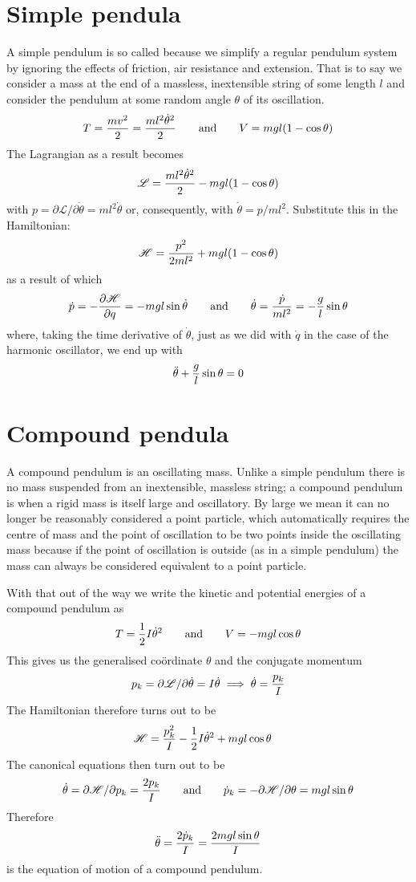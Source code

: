 \documentclass[english,seminar,headertitle]{lecture}
\newcommand{\lag}{\mathscr{L}}
\newcommand{\ham}{\mathscr{H}}
\begin{document}
\section{Simple pendula}

A simple pendulum is so called because we simplify a regular pendulum system by ignoring the effects of friction, air resistance and extension. That is to say we consider a mass at the end of a massless, inextensible string of some length $l$ and consider the pendulum at some random angle $\theta$ of its oscillation.
$$
T = {mv^2 \over 2} = {ml^2\dot{\theta}^2 \over 2} \qquad \textrm{and} \qquad V = mgl(1-\cos\theta)
$$
The Lagrangian as a result becomes
$$
\lag = {ml^2\dot{\theta}^2 \over 2} - mgl(1-\cos\theta)
$$
with $p = \partial \lag / \partial \dot{\theta} = ml^2\dot{\theta}$ or, consequently, with $\dot{\theta} = p/ml^2$. Substitute this in the Hamiltonian:
$$
\ham = {p^2 \over 2ml^2} + mgl(1-\cos\theta)
$$
as a result of which
$$
\dot{p} = -{\partial \ham \over \partial q} = -mgl\sin\dot{\theta} \qquad \textrm{and} \qquad \dot{\theta} = {\dot{p} \over ml^2} = -{g\over l}\sin\theta
$$
where, taking the time derivative of $\dot{\theta}$, just as we did with $\dot{q}$ in the case of the harmonic oscillator, we end up with
\begin{equation}
\ddot{\theta} + {g \over l} \sin\theta = 0	\label{eq:simple-pendulum}
\end{equation}

\section{Compound pendula}

A compound pendulum is an oscillating mass. Unlike a simple pendulum there is no mass suspended from an inextensible, massless string; a compound pendulum is when a rigid mass is itself large and oscillatory. By large we mean it can no longer be reasonably considered a point particle, which automatically requires the centre of mass and the point of oscillation to be two points inside the oscillating mass because if the point of oscillation is outside (as in a simple pendulum) the mass can always be considered equivalent to a point particle.

With that out of the way we write the kinetic and potential energies of a compound pendulum as
$$
T = {1\over 2}I\dot{\theta}^2 \qquad \textrm{and} \qquad V = -mgl\cos\theta 
$$
This gives us the generalised co\"{o}rdinate $\theta$ and the conjugate momentum
$$
p_k = \partial\lag/\partial\dot{\theta} = I\dot{\theta} \implies \dot{\theta} = {{p}_k \over I}
$$
The Hamiltonian therefore turns out to be
\begin{align*}
\ham &= {p_k^2 \over I} - {1\over 2}I\dot{\theta}^2 + mgl\cos\theta
\end{align*}
The canonical equations then turn out to be
$$
\dot{\theta} = \partial\ham/\partial p_k = {2p_k \over I} \qquad \textrm{and} \qquad \dot{p}_k = -\partial\ham/\partial \theta = mgl\sin\theta
$$
Therefore
$$
\ddot{\theta} = {2\dot{p}_k \over I} = {2mgl \sin\theta \over I}
$$
is the equation of motion of a compound pendulum.
\end{document}
